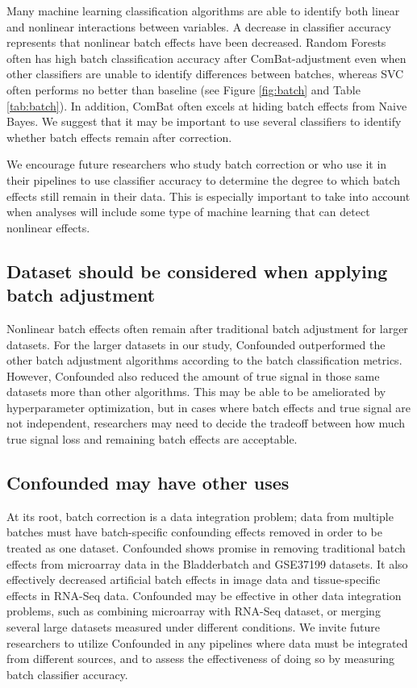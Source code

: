\documentclass[notitlepage]{article}
\begin{document}
Many machine learning classification algorithms are able to identify both linear and nonlinear interactions between variables.
A decrease in classifier accuracy represents that nonlinear batch effects have been decreased.
Random Forests often has high batch classification accuracy after ComBat-adjustment even when other classifiers are unable to identify differences between batches, whereas SVC often performs no better than baseline (see Figure \ref{fig:batch} and Table \ref{tab:batch}).
In addition, ComBat often excels at hiding batch effects from Naive Bayes.
We suggest that it may be important to use several classifiers to identify whether batch effects remain after correction.

We encourage future researchers who study batch correction or who use it in their pipelines to use classifier accuracy to determine the degree to which batch effects still remain in their data.
This is especially important to take into account when analyses will include some type of machine learning that can detect nonlinear effects.

\subsection{Dataset should be considered when applying batch adjustment}

Nonlinear batch effects often remain after traditional batch adjustment for larger datasets.
For the larger datasets in our study, Confounded outperformed the other batch adjustment algorithms according to the batch classification metrics.
However, Confounded also reduced the amount of true signal in those same datasets more than other algorithms.
This may be able to be ameliorated by hyperparameter optimization,
but in cases where batch effects and true signal are not independent, researchers may need to decide the tradeoff between how much true signal loss and remaining batch effects are acceptable.

\subsection{Confounded may have other uses}

At its root, batch correction is a data integration problem;
data from multiple batches must have batch-specific confounding effects removed in order to be treated as one dataset.
Confounded shows promise in removing traditional batch effects from microarray data in the Bladderbatch and GSE37199 datasets.
It also effectively decreased artificial batch effects in image data and tissue-specific effects in RNA-Seq data.
Confounded may be effective in other data integration problems, such as combining microarray with RNA-Seq dataset, or merging several large datasets measured under different conditions.
We invite future researchers to utilize Confounded in any pipelines where data must be integrated from different sources, and to assess the effectiveness of doing so by measuring batch classifier accuracy.


\end{document}
